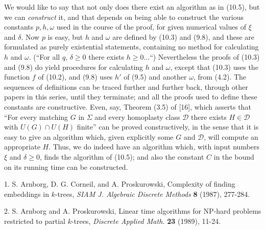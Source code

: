 We would like to say that not only does there exist an algorithm as in (10.5), but we can \textit{construct} it, and that depends on being able to construct the various constants $p, h, \omega$ used in the course of the proof, for given numerical values of $\xi$ and $\delta$. Now $p$ is easy, but $h$ and $\omega$ are defined by (10.3) and (9.8), and these are formulated as purely existential statements, containing no method for calculating $h$ and $\omega$. (``For all $q$, $\delta \ge 0$ there exists $h \ge 0\dots$``) Nevertheless the proofs of (10.3) and (9.8) do yield procedures for calculating $h$ and $\omega$, except that (10.3) uses the function $f$ of (10.2), and (9.8) uses $h'$ of (9.5) and another $\omega$, from (4.2). The sequences of definitions can be traced further and further back, through other papers in this series, until they terminate; and all the proofs used to define these constants are constructive. Even, say, Theorem (3.5) of [16], which asserts that ``For every matching $G$ in $\Sigma$ and every homoplasty class $\mathcal{D}$ there exists $H \in \mathcal{D}$ with $U(G) \cap U(H)$ finite'' can be proved constructively, in the sense that it is easy to give an algorithm which, given explicitly some $G$ and $\mathcal{D}$, will compute an appropriate $H$. Thus, we do indeed have an algorithm which, with input numbers $\xi$ and $\delta \ge 0$, finds the algorithm of (10.5); and also the constant $C$ in the bound on its running time can be constructed.


1. S. Arnborg, D. G. Corneil, and A. Proskurowski, Complexity of finding embeddings in $k$-trees, \textit{SIAM J. Algebraic Discrete Methods} \textbf{8} (1987), 277-284.

2. S. Arnborg and A. Proskurowski, Linear time algorithms for NP-hard problems restricted to partial $k$-trees, \textit{Discrete Applied Math.} \textbf{23} (1989), 11-24.

